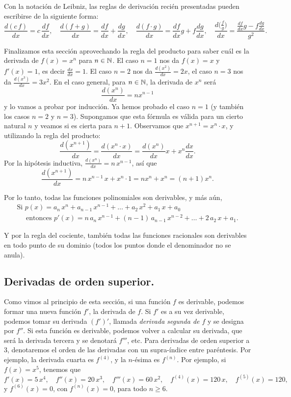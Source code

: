 Con la notación de Leibniz, las reglas de derivación recién presentadas pueden escribirse de la siguiente forma:
\[
\frac{d(c\, f)}{dx} = c\, \frac{df}{dx},
\quad
\frac{d(f+g) }{dx} = \frac{d f}{dx}+\frac{d g}{dx},
\quad
\frac{d(f\cdot g)}{dx} = \frac{df}{dx}g+f \frac{dg}{dx},
\quad
\frac{d\big(\frac f g\big)}{dx} = \frac{\frac{df}{dx}g-f \frac{dg}{dx}}{g^2}.
\]

Finalizamos esta sección aprovechando la regla del producto para saber cuál es la derivada de $f(x) = x^n$ para $n\in\mathbb{N}$.
El caso $n=1$ nos da $f(x)=x$ y $f'(x)=1$, es decir $\frac{dx}{dx}=1$. El caso $n=2$ nos da $\frac{d(x^2)}{dx}=2x$, el caso $n=3$ nos da $\frac{d(x^3)}{dx}=3x^2$. En el caso general, para $n\in\mathbb{N}$, la derivada de $x^n$ será $$\frac{d(x^n)}{dx}=n x^{n-1}$$ y lo vamos a probar por inducción. Ya hemos probado el caso $n=1$ (y también los casos $n=2$ y $n=3$). Supongamos que esta fórmula es válida para un cierto natural $n$ y veamos si es cierta para $n+1$. Observamos que $x^{n+1} = x^n \cdot x$, y utilizando la regla del producto:
\[
\frac{d(x^{n+1})}{dx}
=
\frac{d(x^n\cdot x)}{dx}
= 
\frac{d(x^n)}{dx} x + x^n \frac{dx}{dx}.
\]
Por la hipótesis inductiva, $\frac{d(x^n)}{dx}=n\, x^{n-1}$, así que
\[
\frac{d(x^{n+1})}{dx}
= n\, x^{n-1} \, x + x^n \cdot 1
= n x^n + x^n = (n+1)x^n.
\]

Por lo tanto, todas las funciones polinomiales son derivables, y más aún, 
\begin{multline*}
\text{Si }p(x) = a_n \, x^n + a_{n-1} \, x^{n-1} + \dots + a_2 \, x^2 + a_1 \, x + a_0
\\
\quad\text{\ \ entonces \ \ }
p'(x) = n\, a_n \, x^{n-1} + (n-1) \, a_{n-1} \, x^{n-2} + \dots + 2\, a_2 \, x + a_1.
\end{multline*}

Y por la regla del cociente, también todas las funciones racionales son derivables en todo punto de su dominio (todos los puntos donde el denominador no se anula).


\subsection*{Derivadas de orden superior.}
Como vimos al principio de esta sección, si una función $f$ es derivable, podemos formar una nueva función $f'$, la derivada de $f$. Si $f'$ es a su vez derivable, podemos tomar su derivada $(f')'$, llamada \emph{derivada segunda de $f$} y se designa por $f''$. Si esta función es derivable, podemos volver a calcular su derivada, que será la derivada tercera y se denotará $f'''$, etc. Para derivadas de orden superior a $3$, denotaremos el orden de las derivadas con un supra-índice entre paréntesis. Por ejemplo, la derivada cuarta es $f^{(4)}$, y la $n$-ésima es $f^{(n)}$.
Por ejemplo, si $f(x)=x^5$, tenemos que
\[
f'(x)=5\,x^4,\quad
f''(x)=20\,x^3,\quad
f'''(x)=60\,x^2,\quad
f^{(4)}(x)=120\,x,\quad
f^{(5)}(x)=120,
\]
y $f^{(6)}(x)=0$, con $f^{(n)}(x)=0$, para todo $n\ge 6$.

